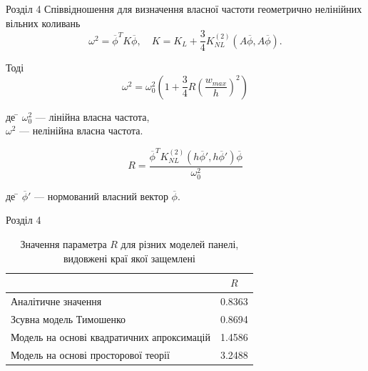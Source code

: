\documentclass[8pt]{beamer}
\numberwithin{figure}{section}
\numberwithin{equation}{section}
\numberwithin{table}{section}
\begin{document}
\begin{frame}{Розділ 4}
Співвідношення для визначення власної частоти геометрично нелінійних вільних коливань
\begin{equation}
\omega^2=\overline{\phi}^T K \overline{\phi}, \quad K = K_L + \frac34 K_{NL}^{(2)}\left( A\overline{\phi},A\overline{\phi} \right).
\end{equation}

Тоді
\begin{equation}
\omega^2=\omega_0^2\left(1+\frac{3}{4}R\left(\frac{w_{max}}{h}\right)^2\right)
\end{equation}

\begin{tabbing}
де \= $\omega_0^2$ --- лінійна власна частота,\\
\> $\omega^2$ --- нелінійна власна частота.
\end{tabbing}

\begin{equation}
R=\frac{\overline{\phi}^T K_{NL}^{(2)}\left( h\overline{\phi}',h\overline{\phi}' \right) \overline{\phi}}{\omega_0^2}
\end{equation}

\begin{tabbing}
де \= $\overline{\phi}'$ --- нормований власний вектор $\overline{\phi}$.
\end{tabbing}


\end{frame}

\begin{frame}{Розділ 4}
\begin{table}[h!]
\centering
 \begin{tabular}{| l | c |} 
 \hline
 & $R$ \\ 
 \hline
 Аналітичне значення\footnotemark & 0.8363 \\ 
 \hline
 Зсувна модель Тимошенко & 0.8694 \\ 
 \hline
 Модель на основі квадратичних апроксимацій & 1.4586 \\ 
 \hline
 Модель на основі просторової теорії & 3.2488 \\
 \hline
\end{tabular}
\caption{Значення параметра $R$ для різних моделей панелі, видовжені краї якої защемлені}
\label{table:1}
\end{table}

\end{frame}
\end{document}
